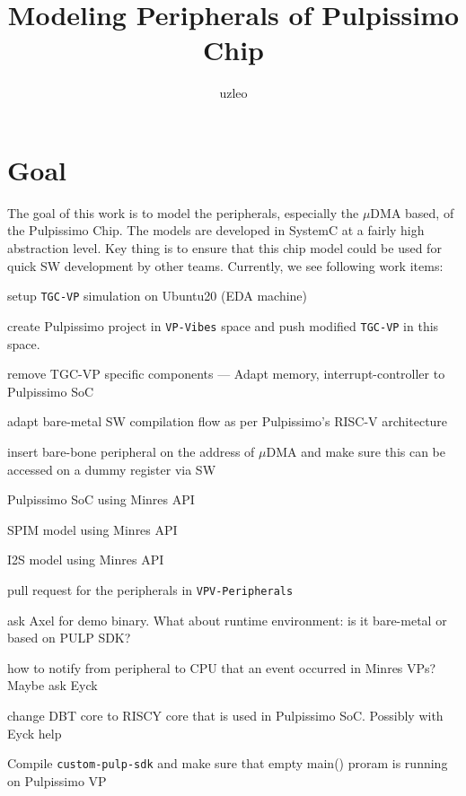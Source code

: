 \documentclass{article}
\title{Modeling Peripherals of Pulpissimo Chip}
\author{uzleo}
\date{}
\newcommand{\cmark}{\ding{51}}%
\newcommand{\done}{\rlap{$\square$}{\raisebox{2pt}{\large\hspace{1pt}\cmark}}%
\hspace{-2.5pt}}
\begin{document}
\maketitle


\section{Goal}
The goal of this work is to model the peripherals, especially the $\mu$DMA based, of the Pulpissimo Chip.
The models are developed in SystemC at a fairly high abstraction level. Key thing is to ensure that this
chip model could be used for quick SW development by other teams. Currently, we see following work items:

\begin{todolist}
 \item[\done] setup \texttt{TGC-VP} simulation on Ubuntu20 (EDA machine)
 \item[\done] create Pulpissimo project in \texttt{VP-Vibes} space and push modified \texttt{TGC-VP} in this space.
 \item[\done] remove TGC-VP specific components --- Adapt memory, interrupt-controller to Pulpissimo SoC
 \item[\done] adapt bare-metal SW compilation flow as per Pulpissimo's RISC-V architecture
 \item[\done] insert bare-bone peripheral on the address of $\mu$DMA and make sure this can be accessed on a
 dummy register via SW
 \item Pulpissimo SoC using Minres API
 \item SPIM model using Minres API
 \item I2S model using Minres API
 \item[\done] pull request for the peripherals in \texttt{VPV-Peripherals}
 \item[\done] ask Axel for demo binary. What about runtime environment: is it bare-metal or based on PULP SDK?
 \item how to notify from peripheral to CPU that an event occurred in Minres VPs? Maybe ask Eyck
 \item change DBT core to RISCY core that is used in Pulpissimo SoC. Possibly with Eyck help
 \item Compile \texttt{custom-pulp-sdk} and make sure that empty main() proram is running on Pulpissimo VP
\end{todolist}
\end{document}
